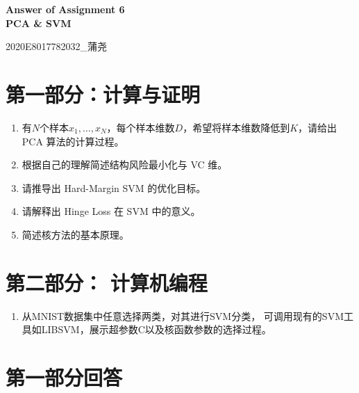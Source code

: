 \documentclass[a4paper,11pt,onecolumn,oneside,UTF8]{article}
\begin{document}
\begin{center}
    \Large\textbf{Answer of Assignment 6\\PCA \& SVM}
\end{center}

\begin{flushright}
    2020E8017782032\_蒲尧
\end{flushright}

\section*{第一部分：计算与证明}

\begin{enumerate}
    \item 有$N$个样本$x_1,…, x_N$，每个样本维数$D$，希望将样本维数降低到$K$，请给出 PCA 算法的计算过程。
    \item 根据自己的理解简述结构风险最小化与 VC 维。
    \item 请推导出 Hard-Margin SVM 的优化目标。
    \item 请解释出 Hinge Loss 在 SVM 中的意义。
    \item 简述核方法的基本原理。
\end{enumerate}

\section*{第二部分： 计算机编程}
\begin{enumerate}[6.]
    \item 从MNIST数据集中任意选择两类，对其进行SVM分类，
          可调用现有的SVM工具如LIBSVM，展示超参数C以及核函数参数的选择过程。
\end{enumerate}


\section*{第一部分回答}
\end{document}
